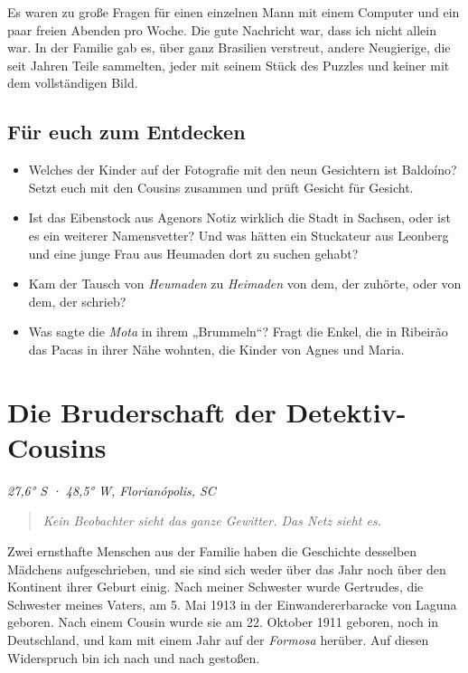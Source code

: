 \documentclass[
  ngerman,
  11pt,
  openany]{book}
\providecommand{\tightlist}{%
  \setlength{\itemsep}{0pt}\setlength{\parskip}{0pt}}
\begin{document}
Es waren zu große Fragen für einen einzelnen Mann mit einem Computer und
ein paar freien Abenden pro Woche. Die gute Nachricht war, dass ich
nicht allein war. In der Familie gab es, über ganz Brasilien verstreut,
andere Neugierige, die seit Jahren Teile sammelten, jeder mit seinem
Stück des Puzzles und keiner mit dem vollständigen Bild.

\section{Für euch zum Entdecken}\label{fuxfcr-euch-zum-entdecken-1}

\begin{itemize}
\tightlist
\item
  Welches der Kinder auf der Fotografie mit den neun Gesichtern ist
  Baldoíno? Setzt euch mit den Cousins zusammen und prüft Gesicht für
  Gesicht.
\item
  Ist das Eibenstock aus Agenors Notiz wirklich die Stadt in Sachsen,
  oder ist es ein weiterer Namensvetter? Und was hätten ein Stuckateur
  aus Leonberg und eine junge Frau aus Heumaden dort zu suchen gehabt?
\item
  Kam der Tausch von \emph{Heumaden} zu \emph{Heimaden} von dem, der
  zuhörte, oder von dem, der schrieb?
\item
  Was sagte die \emph{Mota} in ihrem „Brummeln``? Fragt die Enkel, die
  in Ribeirão das Pacas in ihrer Nähe wohnten, die Kinder von Agnes und
  Maria.
\end{itemize}

\chapter{Die Bruderschaft der Detektiv-Cousins}\label{cap-3}

\emph{27,6° S · 48,5° W, Florianópolis, SC}

\begin{quote}
\emph{Kein Beobachter sieht das ganze Gewitter. Das Netz sieht es.}
\end{quote}

Zwei ernsthafte Menschen aus der Familie haben die Geschichte desselben
Mädchens aufgeschrieben, und sie sind sich weder über das Jahr noch über
den Kontinent ihrer Geburt einig. Nach meiner Schwester wurde Gertrudes,
die Schwester meines Vaters, am 5. Mai 1913 in der Einwandererbaracke
von Laguna geboren. Nach einem Cousin wurde sie am 22. Oktober 1911
geboren, noch in Deutschland, und kam mit einem Jahr auf der
\emph{Formosa} herüber. Auf diesen Widerspruch bin ich nach und nach
gestoßen.
\end{document}

